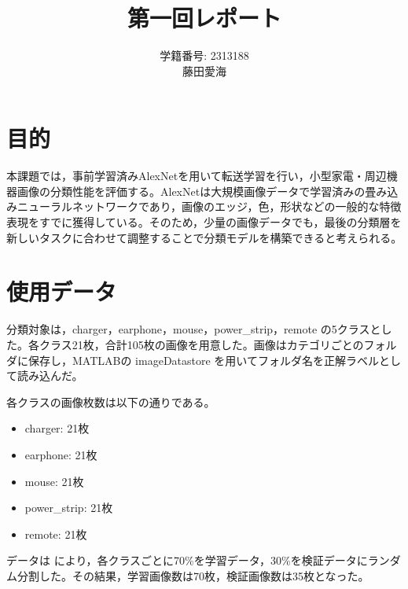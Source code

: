 \documentclass[a4paper,11pt]{ltjsarticle}
\title{第一回レポート}
\author{学籍番号: 2313188 \\ 藤田愛海}
\date{}
\begin{document}
\maketitle

\section{目的}
本課題では，事前学習済みAlexNetを用いて転送学習を行い，小型家電・周辺機器画像の分類性能を評価する。AlexNetは大規模画像データで学習済みの畳み込みニューラルネットワークであり，画像のエッジ，色，形状などの一般的な特徴表現をすでに獲得している。そのため，少量の画像データでも，最後の分類層を新しいタスクに合わせて調整することで分類モデルを構築できると考えられる。

\section{使用データ}
分類対象は，charger，earphone，mouse，power\_strip，remote の5クラスとした。各クラス21枚，合計105枚の画像を用意した。画像はカテゴリごとのフォルダに保存し，MATLABの imageDatastore を用いてフォルダ名を正解ラベルとして読み込んだ。

各クラスの画像枚数は以下の通りである。
\begin{itemize}
  \item charger: 21枚
  \item earphone: 21枚
  \item mouse: 21枚
  \item power\_strip: 21枚
  \item remote: 21枚
\end{itemize}

データは  により，各クラスごとに70\%を学習データ，30\%を検証データにランダム分割した。その結果，学習画像数は70枚，検証画像数は35枚となった。
\end{document}
